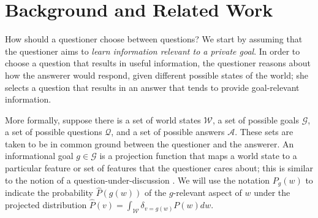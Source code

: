 \documentclass[10pt,letterpaper]{article}
\begin{document}
\section{Background and Related Work}

How should a questioner choose between questions?
%
We start by assuming that the questioner aims to \emph{learn information relevant to a private goal}.
%
In order to choose a question that results in useful information, the questioner reasons about how the answerer would respond, given different possible states of the world; she selects a question that results in an answer that tends to provide goal-relevant information.
%


More formally, suppose there is a set of world states $\mathcal{W}$, a set of possible goals $\mathcal{G}$, a set of possible questions $\mathcal{Q}$, and a set of possible answers $\mathcal{A}$.
These sets are taken to be in common ground between the questioner and the answerer.
An informational goal $g \in \mathcal{G}$ is a projection function that maps a world state to a particular feature or set of features that the questioner cares about; this is similar to the notion of a question-under-discussion \cite{Roberts96_InformationStructureDiscourse}.
We will use the notation $P_{g}(w)$ to indicate the probability $\hat{P}(g(w))$ of the $g$-relevant aspect of $w$ under the projected distribution 
$\hat{P}(v) = \int_{\mathcal{W}} \delta_{v=g(w)}P(w)dw$.

\newcommand{\KL}[2]{\ensuremath{D_{KL}({#1}\, \| \, {#2})}}
\newcommand{\E}[2]{\ensuremath{\mathbb{E}_{#1}\left [#2 \right]}}
\end{document}
